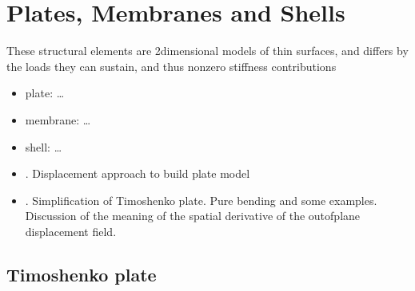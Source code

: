 \documentclass[letterpaper,10pt,english]{jupyterBook}
\begin{document}
\sphinxstepscope


\chapter{Plates, Membranes and Shells}
\label{\detokenize{ch/solids/plates-shells:plates-membranes-and-shells}}\label{\detokenize{ch/solids/plates-shells:solid-mechanics-small-displacements-plates-shells}}\label{\detokenize{ch/solids/plates-shells::doc}}
\sphinxAtStartPar
These structural elements are 2\sphinxhyphen{}dimensional models of thin surfaces, and differs by the loads they can sustain, and thus non\sphinxhyphen{}zero stiffness contributions
\begin{itemize}
\item {} 
\sphinxAtStartPar
plate: …

\item {} 
\sphinxAtStartPar
membrane: …

\item {} 
\sphinxAtStartPar
shell: …

\item {} 
\sphinxAtStartPar
{\hyperref[\detokenize{ch/solids/plates-shells/timoshenko:solid-mechanics-small-displacements-plates-shells-timoshenko}]{}}. Displacement approach to build plate model

\item {} 
\sphinxAtStartPar
{\hyperref[\detokenize{ch/solids/plates-shells/kirchhoff:solid-mechanics-small-displacements-plates-shells-kirchhoff}]{}}. Simplification of Timoshenko plate. Pure bending and some examples. Discussion of the meaning of the spatial derivative of the out\sphinxhyphen{}of\sphinxhyphen{}plane displacement field.

\end{itemize}



\sphinxstepscope


\section{Timoshenko plate}
\label{\detokenize{ch/solids/plates-shells/timoshenko:timoshenko-plate}}\label{\detokenize{ch/solids/plates-shells/timoshenko:solid-mechanics-small-displacements-plates-shells-timoshenko}}\label{\detokenize{ch/solids/plates-shells/timoshenko::doc}}
\end{document}
